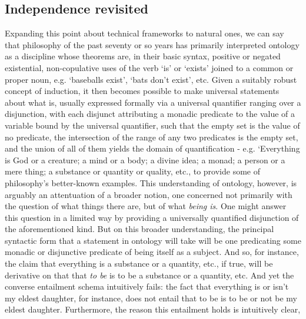\documentclass[]{article}
\begin{document}
\subsection{Independence revisited}
Expanding this point about technical frameworks to natural ones,
we can say that 
philosophy of the past seventy or so years has primarily interpreted ontology 
as a discipline whose theorems are, 
in their basic syntax, 
positive or negated existential, non-copulative uses of the verb `is' or `exists' joined to a common or proper noun, 
e.g. `baseballs exist', `bats don't exist', etc.
Given a suitably robust concept of induction, it then becomes possible to make universal statements about what is, 
usually expressed formally via a universal quantifier ranging over a disjunction, 
with each disjunct
attributing a monadic predicate to the value of a variable bound by the universal
quantifier, 
such that the empty set is the value of no predicate, 
the intersection of the range of any two predicates is the empty set, 
and the union of all of them
yields the domain of quantification - 
e.g. `Everything is God or a creature; a mind or a body; a divine idea; a monad; a person or a mere thing; a substance or quantity or quality, etc., to provide some of philosophy's better-known examples. 
This understanding of ontology, 
however, 
is arguably 
an attentuation of a broader notion,
one concerned not primarily with the question of what things there are, but of what \emph{being is}. 
One might answer this question in a limited way by providing a universally quantified disjunction of the aforementioned kind. 
But on this broader understanding, 
the principal syntactic form that a statement in ontology will take will be one predicating some monadic or disjunctive predicate of being itself as a subject. 
And so, for instance, the claim that everything is a substance or a quantity, etc., 
if true, 
will be derivative on that that \emph{to be} is to be a substance or a quantity, etc.
And yet the converse entailment schema intuitively fails: 
the fact that everything is or isn't my eldest daughter, for instance, 
does not entail that to be is to be or not be my eldest daughter. 
Furthermore, the reason this entailment holds is intuitively clear, 
\end{document}
